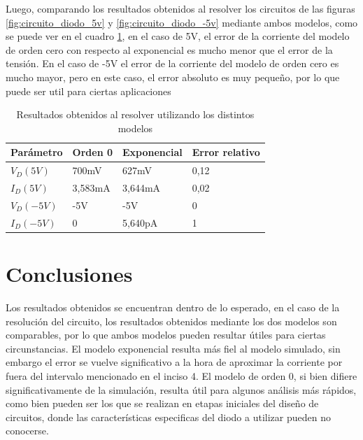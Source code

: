 \documentclass[10pt]{article}
\begin{document}
\quad Luego, comparando los resultados obtenidos al resolver los circuitos de las figuras \ref{fig:circuito_diodo_5v} y \ref{fig:circuito_diodo_-5v} mediante ambos modelos, como se puede ver en el cuadro \ref{tab:cuadro_comparativo_de_resultados}, en el caso de 5V, el error de la corriente del modelo de orden cero con respecto al exponencial es mucho menor que el error de la tensión. En el caso de -5V el error de la corriente del modelo de orden cero es mucho mayor, pero en este caso, el error absoluto es muy pequeño, por lo que puede ser util para ciertas aplicaciones
\begin{table}[ht!]
  \begin{center}
    \caption{Resultados obtenidos al resolver utilizando los distintos modelos}
    \label{tab:cuadro_comparativo_de_resultados}  %
    \begin{tabular}{|l|l|l|l|} %
    \hline
      Parámetro & Orden 0 & Exponencial & Error relativo\\ 
      \hline
      $V_D(5V)$ & 700mV & 627mV & 0,12\\
      \hline        %
      $I_D(5V)$ & 3,583mA & 3,644mA & 0,02\\
      \hline
      $V_D(-5V)$ & -5V & -5V & 0\\ 
      \hline
      $I_D(-5V)$ & 0 & 5,640pA & 1\\
      \hline
    \end{tabular}
  \end{center}
  
\end{table}


\section{Conclusiones}
\quad Los resultados obtenidos se encuentran dentro de lo esperado, en el caso de la resolución del circuito, los resultados obtenidos mediante los dos modelos son comparables, por lo que ambos modelos pueden resultar útiles para ciertas circunstancias. El modelo exponencial resulta más fiel al modelo simulado, sin embargo el error se vuelve significativo a la hora de aproximar la corriente por fuera del intervalo mencionado en el inciso 4. El modelo de orden 0, si bien difiere significativamente de la simulación, resulta útil para algunos análisis más rápidos, como bien pueden ser los que se realizan en etapas iniciales del diseño de circuitos, donde las características especificas del diodo a utilizar pueden no conocerse.
\end{document}
